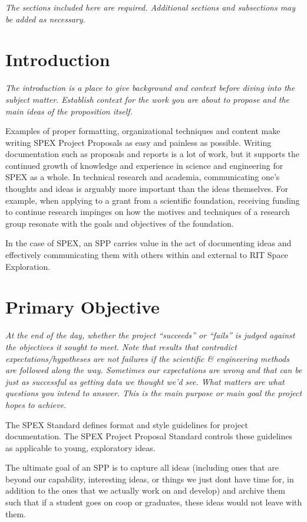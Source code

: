 \documentclass[journal]{SPEXformat}
\newcommand*{\HELP}{}%
\begin{document}
\printnomenclature{}
\ifdefined\HELP\em
  The sections included here are required. Additional sections and subsections may be added as necessary.
\em\fi
\section{Introduction}
\label{sec:introduction}
\ifdefined\HELP\em
  The introduction is a place to give background and context before diving into the subject matter.
  Establish context for the work you are about to propose and the main ideas of the proposition itself.
\em\fi

Examples of proper formatting, organizational techniques and content make writing SPEX Project Proposals as easy and painless as possible.
Writing documentation such as proposals and reports is a lot of work, but it supports the continued growth of knowledge and experience in science and engineering for SPEX as a whole.
In technical research and academia, communicating one's thoughts and ideas is arguably more important than the ideas themselves.
For example, when applying to a grant from a scientific foundation, receiving funding to continue research impinges on how the motives and techniques of a research group resonate with the goals and objectives of the foundation.

In the case of SPEX, an SPP carries value in the act of documenting ideas and effectively communicating them with others within and external to RIT Space Exploration.

\section{Primary Objective}
\label{sec:primary-obj}
\ifdefined\HELP\em
  At the end of the day, whether the project ``succeeds'' or ``fails'' is judged against the objectives it sought to meet.
  Note that results that contradict expectations/hypotheses are not failures if the scientific \& engineering methods are followed along the way.
  Sometimes our expectations are wrong and that can be just as successful as getting data we thought we'd see.
  What matters are what questions you intend to answer.
  This is the main purpose or main goal the project hopes to achieve.
\em\fi

The SPEX Standard defines format and style guidelines for project documentation. The SPEX Project Proposal Standard controls these guidelines as applicable to young, exploratory ideas.

The ultimate goal of an SPP is to capture all ideas (including ones that are beyond our capability, interesting ideas, or things we just dont have time for, in addition to the ones that we actually work on and develop) and archive them such that if a student goes on coop or graduates, these ideas would not leave with them.
\end{document}
